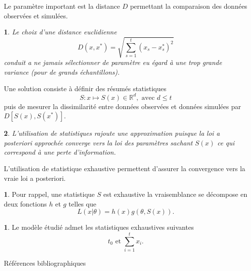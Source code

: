 \documentclass[8pt,notheorems]{beamer}
\newtheorem{remark}{\translate{Remark}}
\theoremstyle{definition}
\newtheorem{definition}{\translate{Definition}}
\theoremstyle{example}
\newtheorem{example}{\translate{Example}}
\theoremstyle{mystyle}
\theoremstyle{plain}
\begin{document}
\begin{frame}[allowframebreaks]
 Le paramètre important est la distance $D$ permettant la comparaison des données observées et simulées. 
 \begin{remark}
 Le choix d'une distance euclidienne 
$$
D(x,x^\ast) = \sqrt{\sum_{s = 1}^t(x_s - x_s^\ast)^2}
$$
conduit a ne jamais sélectionner de paramètre eu égard à une trop grande variance (pour de grands échantillons).
\end{remark} 
Une solution consiste à définir des résumés statistiques
$$
S:x\mapsto S(x)\in\mathbb{R}^{d},\text{ avec } d\leq t
$$
puis de mesurer la dissimilarité entre données observées et données simulées par $D[S(x),S(x^\ast)]$.
\begin{remark} 
L'utilisation de statistiques rajoute une approximation puisque la loi a posteriori approchée converge vers la loi des paramètres sachant $S(x)$ ce qui correspond à une perte d'information.
\end{remark} 
L'utilisation de statistique exhaustive permettent d'assurer la convergence vers la vraie loi a posteriori.
\begin{definition} 
Pour rappel, une statistique $S$ est exhaustive  la vraisemblance se décompose en deux fonctions $h$ et $g$ telles que
$$
L(x|\theta) = h(x)g(\theta,S(x)).
$$
\end{definition}
\begin{example}
Le modèle étudié admet les statistiques exhaustives suivantes
$$
t_0\text{ et }\sum_{i = 1}^t x_i.
$$
\end{example}

\end{frame}
\begin{frame}[allowframebreaks]{Références bibliographiques}



\end{frame}
\end{document}
